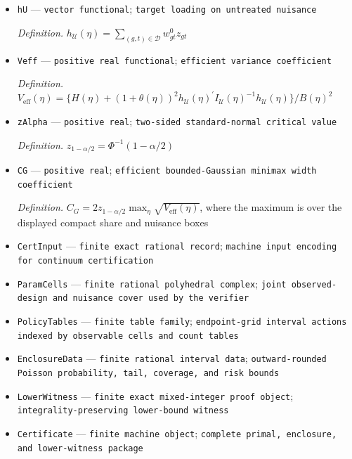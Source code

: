 \documentclass{article}
\begin{document}
\begin{itemize}
  \par\smallskip\noindent\emph{Definition.} \(I_{\mathcal U}(\eta)=\sum_{(g,t)\in\mathcal U}w^0_{gt}z_{gt}z_{gt}^{\prime}\)
  \item \texttt{hU} --- \texttt{vector functional}; \texttt{target loading on untreated nuisance}
  \par\smallskip\noindent\emph{Definition.} \(h_{\mathcal U}(\eta)=\sum_{(g,t)\in\mathcal D}w^0_{gt}z_{gt}\)
  \item \texttt{Veff} --- \texttt{positive real functional}; \texttt{efficient variance coefficient}
  \par\smallskip\noindent\emph{Definition.} \(V_{\mathrm{eff}}(\eta)=\{H(\eta)+(1+\theta(\eta))^2h_{\mathcal U}(\eta)^{\prime}I_{\mathcal U}(\eta)^{-1}h_{\mathcal U}(\eta)\}/B(\eta)^2\)
  \item \texttt{zAlpha} --- \texttt{positive real}; \texttt{two-\allowbreak{}sided standard-\allowbreak{}normal critical value}
  \par\smallskip\noindent\emph{Definition.} \(z_{1-\alpha/2}=\Phi^{-1}(1-\alpha/2)\)
  \item \texttt{CG} --- \texttt{positive real}; \texttt{efficient bounded-\allowbreak{}Gaussian minimax width coefficient}
  \par\smallskip\noindent\emph{Definition.} \(C_G=2z_{1-\alpha/2}\max_{\eta}\sqrt{V_{\mathrm{eff}}(\eta)}\), where the maximum is over the displayed compact share and nuisance boxes
  \item \texttt{CertInput} --- \texttt{finite exact rational record}; \texttt{machine input encoding for continuum certification}
  \item \texttt{ParamCells} --- \texttt{finite rational polyhedral complex}; \texttt{joint observed-\allowbreak{}design and nuisance cover used by the verifier}
  \item \texttt{PolicyTables} --- \texttt{finite table family}; \texttt{endpoint-\allowbreak{}grid interval actions indexed by observable cells and count tables}
  \item \texttt{EnclosureData} --- \texttt{finite rational interval data}; \texttt{outward-\allowbreak{}rounded Poisson probability,\allowbreak{} tail,\allowbreak{} coverage,\allowbreak{} and risk bounds}
  \item \texttt{LowerWitness} --- \texttt{finite exact mixed-\allowbreak{}integer proof object}; \texttt{integrality-\allowbreak{}preserving lower-\allowbreak{}bound witness}
  \item \texttt{Certificate} --- \texttt{finite machine object}; \texttt{complete primal,\allowbreak{} enclosure,\allowbreak{} and lower-\allowbreak{}witness package}

\end{itemize}
\end{document}
